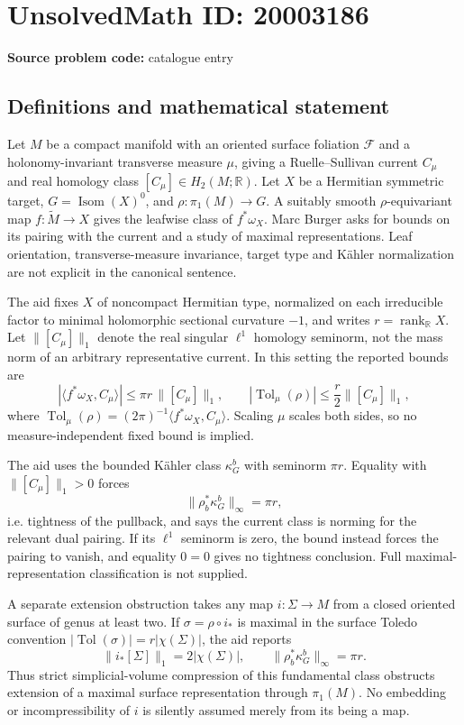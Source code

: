 \documentclass[11pt]{article}
\newcommand{\R}{\mathbb{R}}
\begin{document}
\section*{UnsolvedMath ID: 20003186}
\textbf{Source problem code:} catalogue entry
\subsection{Definitions and mathematical statement}
Let $M$ be a compact manifold with an oriented surface foliation $\mathcal F$ and a holonomy-invariant transverse measure $\mu$, giving a Ruelle--Sullivan current $C_\mu$ and real homology class $[C_\mu]\in H_2(M;\R)$. Let $X$ be a Hermitian symmetric target, $G=\operatorname{Isom}(X)^0$, and $\rho:\pi_1(M)\to G$. A suitably smooth $\rho$-equivariant map $f:\widetilde M\to X$ gives the leafwise class of $f^*\omega_X$. Marc Burger asks for bounds on its pairing with the current and a study of maximal representations. Leaf orientation, transverse-measure invariance, target type and K\"ahler normalization are not explicit in the canonical sentence.

The aid fixes $X$ of noncompact Hermitian type, normalized on each irreducible factor to minimal holomorphic sectional curvature $-1$, and writes $r=\operatorname{rank}_{\R}X$. Let $\|[C_\mu]\|_1$ denote the real singular $\ell^1$ homology seminorm, not the mass norm of an arbitrary representative current. In this setting the reported bounds are
\[
 |\langle f^*\omega_X,C_\mu\rangle|
 \leq\pi r\,\|[C_\mu]\|_1,
 \qquad
 |\operatorname{Tol}_\mu(\rho)|
 \leq\frac r2\|[C_\mu]\|_1,
\]
where $\operatorname{Tol}_\mu(\rho)=(2\pi)^{-1}\langle f^*\omega_X,C_\mu\rangle$. Scaling $\mu$ scales both sides, so no measure-independent fixed bound is implied.

The aid uses the bounded K\"ahler class $\kappa_G^b$ with seminorm $\pi r$. Equality with $\|[C_\mu]\|_1>0$ forces
\[
 \|\rho_b^*\kappa_G^b\|_\infty=\pi r,
\]
i.e. tightness of the pullback, and says the current class is norming for the relevant dual pairing. If its $\ell^1$ seminorm is zero, the bound instead forces the pairing to vanish, and equality $0=0$ gives no tightness conclusion. Full maximal-representation classification is not supplied.

A separate extension obstruction takes any map $i:\Sigma\to M$ from a closed oriented surface of genus at least two. If $\sigma=\rho\circ i_*$ is maximal in the surface Toledo convention $|\operatorname{Tol}(\sigma)|=r|\chi(\Sigma)|$, the aid reports
\[
 \|i_*[\Sigma]\|_1=2|\chi(\Sigma)|,
 \qquad\|\rho_b^*\kappa_G^b\|_\infty=\pi r.
\]
Thus strict simplicial-volume compression of this fundamental class obstructs extension of a maximal surface representation through $\pi_1(M)$. No embedding or incompressibility of $i$ is silently assumed merely from its being a map.
\end{document}
